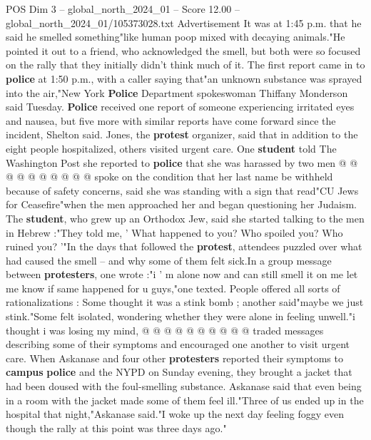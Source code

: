 \begin{textsample}{POS Dim 3 – global\_north\_2024\_01 – Score 12.00 – global\_north\_2024\_01/105373028.txt}
Advertisement It was at 1:45 p.m. that he said he smelled something"like human poop mixed with decaying animals."He pointed it out to a friend, who acknowledged the smell, but both were so focused on the rally that they initially didn't think much of it.
The first report came in to \textbf{police} at 1:50 p.m., with a caller saying that"an unknown substance was sprayed into the air,"New York \textbf{Police} Department spokeswoman Thiffany Monderson said Tuesday. \textbf{Police} received one report of someone experiencing irritated eyes and nausea, but five more with similar reports have come forward since the incident, Shelton said.
Jones, the \textbf{protest} organizer, said that in addition to the eight people hospitalized, others visited urgent care.
One \textbf{student} told The Washington Post she reported to \textbf{police} that she was harassed by two men @ @ @ @ @ @ @ @ @ @ spoke on the condition that her last name be withheld because of safety concerns, said she was standing with a sign that read"CU Jews for Ceasefire"when the men approached her and began questioning her Judaism.
The \textbf{student}, who grew up an Orthodox Jew, said she started talking to the men in Hebrew :"They told me, ' What happened to you?
Who spoiled you?
Who ruined you? '"In the days that followed the \textbf{protest}, attendees puzzled over what had caused the smell -- and why some of them felt sick.In a group message between \textbf{protesters}, one wrote :"i ' m alone now and can still smell it on me let me know if same happened for u guys,"one texted.
People offered all sorts of rationalizations : Some thought it was a stink bomb ; another said"maybe we just stink."Some felt isolated, wondering whether they were alone in feeling unwell."i thought i was losing my mind, @ @ @ @ @ @ @ @ @ @ traded messages describing some of their symptoms and encouraged one another to visit urgent care.
When Askanase and four other \textbf{protesters} reported their symptoms to \textbf{campus} \textbf{police} and the NYPD on Sunday evening, they brought a jacket that had been doused with the foul-smelling substance.
Askanase said that even being in a room with the jacket made some of them feel ill."Three of us ended up in the hospital that night,"Askanase said."I woke up the next day feeling foggy even though the rally at this point was three days ago."

\end{textsample}
